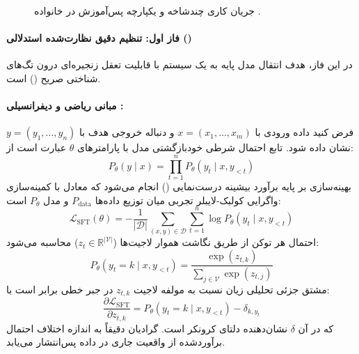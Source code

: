 \begin{figure}[htbp]
{%
}
\caption{جریان کاری چندشاخه و یکپارچه پس‌آموزش در خانواده .}
\label{fig:olmo3_post_training_pipeline}
\end{figure}

\paragraph*{فاز اول: تنظیم دقیق نظارت‌شده استدلالی ()}
در این فاز، هدف انتقال مدل پایه به یک سیستم با قابلیت تعقل زنجیره‌ای درون تگ‌های شناختی صریح () است. 

\paragraph*{مبانی ریاضی و دیفرانسیلی :}
فرض کنید داده ورودی با $x = (x_1, \dots, x_m)$ و دنباله خروجی هدف با $y = (y_1, \dots, y_n)$ نشان داده شود. تابع احتمال شرطی خودبازگشتی مدل با پارامترهای $\theta$ عبارت است از:
\begin{equation}
    P_\theta(y \mid x) = \prod_{t=1}^n P_\theta(y_t \mid x, y_{<t})
\end{equation}
بهینه‌سازی بر پایه برآورد بیشینه‌ درست‌نمایی () انجام می‌شود که معادل با کمینه‌سازی واگرایی کولبک-لایبلر تجربی میان توزیع داده‌ها $P_{\text{data}}$ و مدل $P_\theta$ است:
\begin{equation}
    \mathcal{L}_{\text{SFT}}(\theta) = -\frac{1}{|\mathcal{D}|} \sum_{(x, y) \in \mathcal{D}} \sum_{t=1}^n \log P_\theta(y_t \mid x, y_{<t})
\end{equation}
احتمال هر توکن از طریق نگاشت هموار لاجیت‌ها ($z_t \in \mathbb{R}^{|\mathcal{V}|}$) محاسبه می‌شود:
\begin{equation}
    P_\theta(y_t = k \mid x, y_{<t}) = \frac{\exp(z_{t,k})}{\sum_{j \in \mathcal{V}} \exp(z_{t,j})}
\end{equation}
مشتق جزئی تحلیلی زیان نسبت به مولفه لاجیت $z_{t,k}$ در جبر خطی برابر است با:
\begin{equation}
    \frac{\partial \mathcal{L}_{\text{SFT}}}{\partial z_{t,k}} = P_\theta(y_t = k \mid x, y_{<t}) - \delta_{k, y_t}
\end{equation}
که در آن $\delta$ نشان‌دهنده دلتای کرونکر است. گرادیان دقیقاً به اندازه اختلاف احتمال برآوردشده از واقعیت جاری در داده پس‌انتشار می‌یابد.

